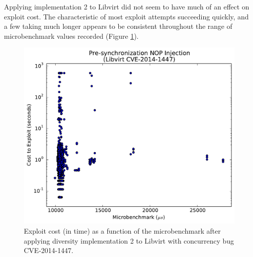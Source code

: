 Applying implementation 2 to Libvirt did not seem to have much of an effect on exploit cost.
The characteristic of most exploit attempts succeeding quickly, and a few taking much longer appears to be consistent throughout the range of microbenchmark values recorded (Figure \ref{fig_libvirt-pre}).
\begin{figure}
	\centering
	\includegraphics[width=\columnwidth]{figures/libvirt-pre}
\caption{Exploit cost (in time) as a function of the microbenchmark after applying diversity implementation 2 to Libvirt with concurrency bug CVE-2014-1447.}
	\label{fig_libvirt-pre}
\end{figure}

